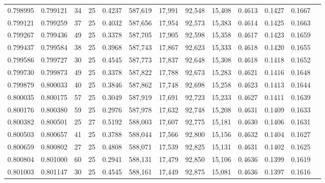 \begin{tabular}{rrrrrrrrrrrrr}
0.798995 & 0.799121 &    34 &  25 &                                     0.4237 & 587,619 &  17,991 &  92,548 &  15,408 & 0.4613 & 0.1427 & 0.1667 \\
0.799121 & 0.799259 &    37 &  25 &                                     0.4032 & 587,656 &  17,954 &  92,573 &  15,383 & 0.4614 & 0.1425 & 0.1663 \\
0.799267 & 0.799436 &    49 &  25 &                                     0.3378 & 587,705 &  17,905 &  92,598 &  15,358 & 0.4617 & 0.1423 & 0.1659 \\
0.799437 & 0.799584 &    38 &  25 &                                     0.3968 & 587,743 &  17,867 &  92,623 &  15,333 & 0.4618 & 0.1420 & 0.1655 \\
0.799586 & 0.799727 &    30 &  25 &                                     0.4545 & 587,773 &  17,837 &  92,648 &  15,308 & 0.4618 & 0.1418 & 0.1652 \\
0.799730 & 0.799873 &    49 &  25 &                                     0.3378 & 587,822 &  17,788 &  92,673 &  15,283 & 0.4621 & 0.1416 & 0.1648 \\
0.799879 & 0.800033 &    40 &  25 &                                     0.3846 & 587,862 &  17,748 &  92,698 &  15,258 & 0.4623 & 0.1413 & 0.1644 \\
0.800035 & 0.800175 &    57 &  25 &                                     0.3049 & 587,919 &  17,691 &  92,723 &  15,233 & 0.4627 & 0.1411 & 0.1639 \\
0.800176 & 0.800380 &    59 &  25 &                                     0.2976 & 587,978 &  17,632 &  92,748 &  15,208 & 0.4631 & 0.1409 & 0.1633 \\
0.800382 & 0.800501 &    25 &  27 &                                     0.5192 & 588,003 &  17,607 &  92,775 &  15,181 & 0.4630 & 0.1406 & 0.1631 \\
0.800503 & 0.800657 &    41 &  25 &                                     0.3788 & 588,044 &  17,566 &  92,800 &  15,156 & 0.4632 & 0.1404 & 0.1627 \\
0.800659 & 0.800802 &    27 &  25 &                                     0.4808 & 588,071 &  17,539 &  92,825 &  15,131 & 0.4631 & 0.1402 & 0.1625 \\
0.800804 & 0.801000 &    60 &  25 &                                     0.2941 & 588,131 &  17,479 &  92,850 &  15,106 & 0.4636 & 0.1399 & 0.1619 \\
0.801003 & 0.801147 &    30 &  25 &                                     0.4545 & 588,161 &  17,449 &  92,875 &  15,081 & 0.4636 & 0.1397 & 0.1616 \\

\end{tabular}
